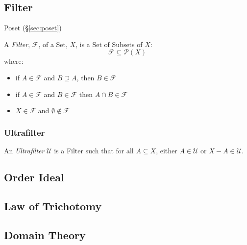 \subsection{Filter}\label{sec:filter}

Poset (\S\ref{sec:poset})

A \emph{Filter}, $\mathcal{F}$, of a Set, $X$, is a Set of Subsets of
$X$:
\[
  \mathcal{F} \subseteq \mathcal{P}(X)
\]
where:
\begin{itemize}
\item if $A \in \mathcal{F}$ and $B \supseteq A$, then $B \in
  \mathcal{F}$
\item if $A \in \mathcal{F}$ and $B \in \mathcal{F}$ then $A \cap B
  \in \mathcal{F}$
\item $X \in \mathcal{F}$ and $\emptyset \notin \mathcal{F}$
\end{itemize}



\subsubsection{Ultrafilter}\label{sec:ultrafilter}

An \emph{Ultrafilter} $\mathcal{U}$ is a Filter such that for all $A
\subseteq X$, either $A \in \mathcal{U}$ or $X - A \in \mathcal{U}$.



\subsection{Order Ideal}\label{sec:order_ideal}

\subsection{Law of Trichotomy}\label{sec:trichotomy_law}

\subsection{Domain Theory}\label{sec:domain_theory}



